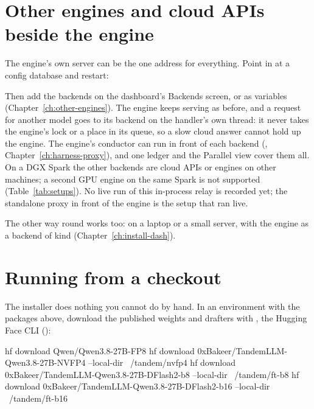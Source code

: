 \section{Other engines and cloud APIs beside the engine}\label{sec:engine-backends}

The engine's own server can be the one address for everything. Point  in  at a config database and restart:


Then add the backends on the dashboard's Backends screen, or as  variables (Chapter~\ref{ch:other-engines}). The engine keeps serving  as before, and a request for another model goes to its backend on the handler's own thread: it never takes the engine's lock or a place in its queue, so a slow cloud answer cannot hold up the engine. The engine's conductor can run in front of each backend (, Chapter~\ref{ch:harness-proxy}), and one ledger and the Parallel view cover them all. On a DGX Spark the other backends are cloud APIs or engines on other machines; a second GPU engine on the same Spark is not supported (Table~\ref{tab:setups}). No live run of this in-process relay is recorded yet; the standalone proxy in front of the engine is the setup that ran live.

The other way round works too:  on a laptop or a small server, with the engine as a backend of kind  (Chapter~\ref{ch:install-dash}).

\section{Running from a checkout}

The installer does nothing you cannot do by hand. In an environment with the packages above, download the published weights and drafters with , the Hugging Face CLI ():

\begin{shell}
hf download Qwen/Qwen3.8-27B-FP8
hf download 0xBakeer/TandemLLM-Qwen3.8-27B-NVFP4 --local-dir ~/tandem/nvfp4
hf download 0xBakeer/TandemLLM-Qwen3.8-27B-DFlash2-b8 --local-dir ~/tandem/ft-b8
hf download 0xBakeer/TandemLLM-Qwen3.8-27B-DFlash2-b16 --local-dir ~/tandem/ft-b16
\end{shell}


